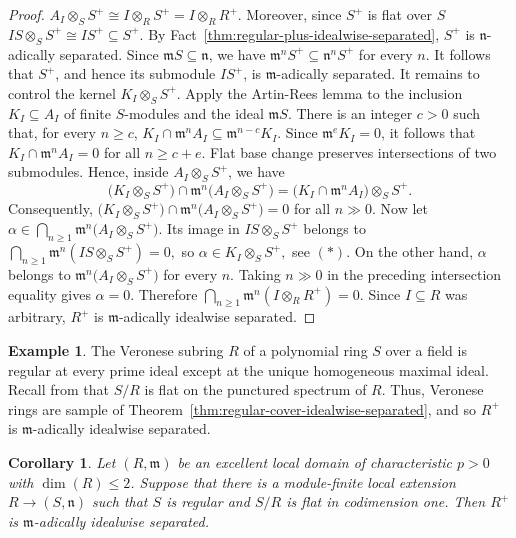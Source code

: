 \documentclass[12pt,reqno]{amsart}
\newtheorem{corollary}[theorem]{Corollary}
\theoremstyle{definition}
\newtheorem{example}[theorem]{Example}
\theoremstyle{remark}
\theoremstyle{cited}
\theoremstyle{remark}
\theoremstyle{citeddef}
\newcommand{\fm}{\mathfrak{m}}
\newcommand{\fn}{\mathfrak{n}}
\begin{document}
\begin{proof}
		\(
		A_I\otimes_SS^+
		\cong
		I\otimes_RS^+
		=
		I\otimes_RR^+.
		\)
		Moreover, since $S^+$ is flat over $S$
		\(
		IS\otimes_SS^+
		\cong
		IS^+
		\subseteq
		S^+.
		\)
		By {Fact}~\ref{thm:regular-plus-idealwise-separated}, $S^+$ is $\fn$-adically separated. Since
		$\fm S\subseteq\fn$, we have
		\(
		\fm^nS^+\subseteq\fn^nS^+
		\)
		for every $n$. It follows that $S^+$, and hence its submodule $IS^+$, is
		$\fm$-adically separated.
		It remains to control the kernel $K_I\otimes_SS^+$. 
		Apply the Artin-Rees
		lemma to the inclusion
		\(
		K_I\subseteq A_I
		\)
		of finite $S$-modules and the ideal $\fm S$. There is an integer $c>0$ such
		that, for every $n\geq c$,
		\(
		K_I\cap\fm^nA_I
		\subseteq
		\fm^{n-c}K_I.
		\)
		Since $\fm^eK_I=0$, it follows that
		\(
		K_I\cap\fm^nA_I=0\)
		{for all } \(n\geq c+e.
		\)
		Flat base change preserves intersections of two submodules. Hence, inside
		$A_I\otimes_SS^+$, we have
		\[
		\bigl(K_I\otimes_SS^+\bigr)
		\cap
		\fm^n\bigl(A_I\otimes_SS^+\bigr)
		=
		\bigl(K_I\cap\fm^nA_I\bigr)\otimes_SS^+.
		\]
		Consequently,
		\(
		\bigl(K_I\otimes_SS^+\bigr)
		\cap
		\fm^n\bigl(A_I\otimes_SS^+\bigr)
		=0\)
		{for all }\(n\gg0.
		\)
		Now let
		\(
		\alpha\in
		\bigcap_{n\geq1}
		\fm^n\bigl(A_I\otimes_SS^+\bigr).
		\)
		Its image in $IS\otimes_SS^+$ belongs to
		\(
		\bigcap_{n\geq1}
		\fm^n(IS\otimes_SS^+)=0,
		\)
		so
		\(
		\alpha\in K_I\otimes_SS^+ ,
		\) see $(\ast)$.
		On the other hand, $\alpha$ belongs to
		\(
		\fm^n\bigl(A_I\otimes_SS^+\bigr)
		\)
		for every $n$. Taking $n\gg0$ in the preceding intersection equality gives
		$\alpha=0$. Therefore
		\(
		\bigcap_{n\geq1}\fm^n(I\otimes_RR^+)=0.
		\)
		Since $I\subseteq R$ was arbitrary, $R^+$ is $\fm$-adically idealwise
		separated.
	\end{proof}
	
	\begin{example}\label{ver}
		The Veronese subring  $R$ of a polynomial ring $S$ over a field is regular at every prime ideal except at the unique homogeneous maximal ideal. Recall from \cite[23.1]{mat}
		that $S/R$ is flat on the punctured spectrum of $R$.
		Thus,  Veronese rings are sample of Theorem~\ref{thm:regular-cover-idealwise-separated}, and so $R^+$  is
		$\fm$-adically idealwise separated.
	\end{example}
	
	
	\begin{corollary}\label{cor:codimension-one-regular-cover}
		Let $(R,\fm)$ be an excellent local domain of characteristic $p>0$ with
		$\dim(R)\leq2$. Suppose that there is a module-finite local extension
		\(
		R\to(S,\fn)
		\)
		such that $S$ is regular and $S/R$ is flat in codimension one. Then $R^+$ is
		$\fm$-adically idealwise separated.
	\end{corollary}
	
\end{document}
